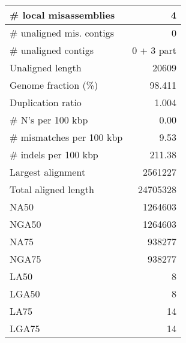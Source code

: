 \documentclass[12pt,a4paper]{article}
\begin{document}
\begin{table}[ht]
\begin{center}
\begin{tabular}{|l*{1}{|r}|}
\# local misassemblies & 4 \\ \hline
\# unaligned mis. contigs & 0 \\ \hline
\# unaligned contigs & 0 + 3 part \\ \hline
Unaligned length & 20609 \\ \hline
Genome fraction (\%) & 98.411 \\ \hline
Duplication ratio & 1.004 \\ \hline
\# N's per 100 kbp & 0.00 \\ \hline
\# mismatches per 100 kbp & 9.53 \\ \hline
\# indels per 100 kbp & 211.38 \\ \hline
Largest alignment & 2561227 \\ \hline
Total aligned length & 24705328 \\ \hline
NA50 & 1264603 \\ \hline
NGA50 & 1264603 \\ \hline
NA75 & 938277 \\ \hline
NGA75 & 938277 \\ \hline
LA50 & 8 \\ \hline
LGA50 & 8 \\ \hline
LA75 & 14 \\ \hline
LGA75 & 14 \\ \hline
\end{tabular}
\end{center}
\end{table}
\end{document}
